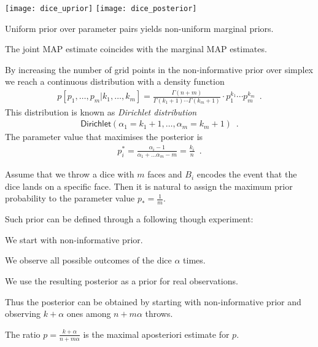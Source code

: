 \documentclass[landscape,footrule]{foils}
\begin{document}

\centerline{
\texttt{[image: dice\_uprior]}\hspace*{1cm}
\texttt{[image: dice\_posterior]}}

\begin{triangles}
\item Uniform prior over parameter pairs yields non-uniform marginal priors.
\item The joint MAP estimate coincides with the marginal MAP estimates.  
\end{triangles}



By increasing the number of grid points in the non-informative prior over simplex we reach a continuous distribution with a density function
\begin{align*}  
p[p_1,\ldots, p_m|k_1,\ldots, k_m] = \frac{\Gamma(n+m)}{\Gamma(k_1+1)\cdots\Gamma(k_m+1)}\cdot p_1^{k_1}\cdots p_m^{k_m}\enspace.
\end{align*}
This distribution is known as \emph{Dirichlet  distribution}
\begin{align*}
 \mathsf{Dirichlet}(\alpha_1=k_1+1,\ldots, \alpha_m=k_m+1)\enspace.
\end{align*} 
The parameter value that maximises the posterior is 
\begin{align*}
p_i^* =\frac{\alpha_i-1}{\alpha_1+\ldots\alpha_m-m}=\frac{k_i}{n}\enspace.
\end{align*} 



Assume that we throw a dice with $m$ faces and $B_i$ encodes the event that the dice lands on a specific face. Then it is natural to assign the maximum prior probability to the parameter value $p_*=\frac{1}{m}$.
\vspace*{1cm}

Such prior can be defined through a following though experiment:
\begin{triangles}
\item We start with non-informative prior.
\item We observe all possible outcomes of the dice $\alpha$ times.
\item We use the resulting posterior as a prior for real observations. 
\end{triangles}
\vspace*{1cm}

Thus the posterior can be obtained by starting with non-informative prior and observing $k+\alpha$ ones among $n + m\alpha$ throws.  
\begin{triangles}
\item The ratio $p=\frac{k+\alpha}{n+m\alpha}$ is the maximal aposteriori estimate for $p$.
\end{triangles}
\end{document}
